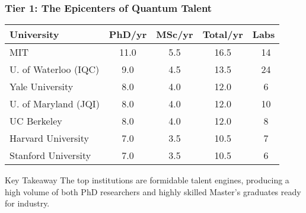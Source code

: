 \documentclass[aspectratio=169]{beamer}
\newcommand{\tabletext}{\normalsize}
\begin{document}
\begin{frame}
    \frametitle{Tier 1: The Epicenters of Quantum Talent}
    \subtitle{Mega-producers with $\geq 10$ total theses per year}

    \begin{table}
        \centering
        \tabletext
        \begin{tabularx}{\textwidth}{
            l
            S[table-format=2.1]
            S[table-format=2.1]
            S[table-format=2.1]
            S[table-format=2.0, table-space-text-pre=~]
        }
            \toprule
            \textbf{University} & {\textbf{PhD/yr}} & {\textbf{MSc/yr}} & {\textbf{Total/yr}} & {\textbf{Labs}} \\
            \midrule
            MIT & 11.0 & 5.5 & 16.5 & ~14 \\
            U. of Waterloo (IQC) & 9.0 & 4.5 & 13.5 & ~24 \\
            Yale University & 8.0 & 4.0 & 12.0 & ~6 \\
            U. of Maryland (JQI) & 8.0 & 4.0 & 12.0 & ~10 \\
            UC Berkeley & 8.0 & 4.0 & 12.0 & ~8 \\
            Harvard University & 7.0 & 3.5 & 10.5 & ~7 \\
            Stanford University & 7.0 & 3.5 & 10.5 & ~6 \\
            \bottomrule
        \end{tabularx}
    \end{table}
    
    \begin{block}{Key Takeaway}
    The top institutions are formidable talent engines, producing a high volume of both PhD researchers and highly skilled Master's graduates ready for industry.
    \end{block}
\end{frame}
\end{document}
